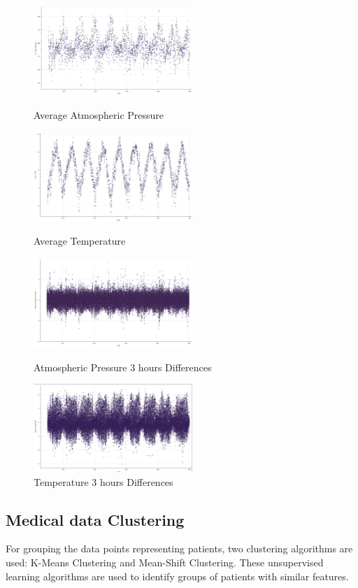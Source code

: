 \documentclass{article}
\begin{document}
\begin{figure}[h!]
\begin{multicols}{2}
\centering
\includegraphics[width=6cm]{PressureAvg.png}
\caption{Average Atmospheric Pressure}

\centering
\includegraphics[width=6cm]{TempAvg.png}
\caption{Average Temperature}

\centering
\includegraphics[width=6cm]{PressureDiff.png}
\caption{Atmospheric Pressure 3 hours Differences}

\centering
\includegraphics[width=6cm]{TempDiff.png}
\caption{Temperature 3 hours Differences}

\end{multicols}
\end{figure}

\subsection{Medical data Clustering}

For grouping the data points representing patients, two clustering algorithms are used: K-Means Clustering and Mean-Shift Clustering. These unsupervised learning algorithms are used to identify groups of patients with similar features.
\end{document}

